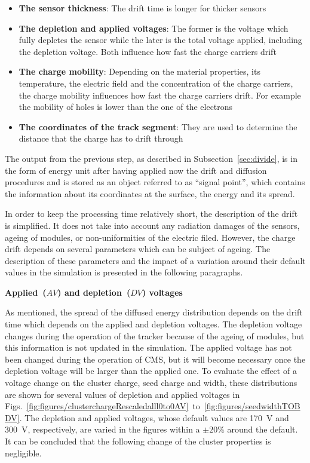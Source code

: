 \begin{itemize}
\item \textbf{The sensor thickness}: The drift time is longer for thicker sensors
\item \textbf{The depletion and applied voltages}:  The former is the voltage which fully depletes the sensor while the later is the total voltage applied, including the depletion voltage. Both influence how fast the charge carriers drift
\item \textbf{The charge mobility}: Depending on the material properties, its temperature, the electric field and the concentration of the charge carriers, the charge mobility influences how fast the charge carriers drift. For example the mobility of holes is lower than the one of the electrons
\item \textbf{The coordinates of the track segment}: They are used to determine the distance that the charge  has to drift through
\end{itemize}


The output from the previous step, as described in Subsection~\ref{sec:divide}, is in the form of energy unit after having applied now the drift and diffusion procedures and is stored as an object referred to as ``signal point'', which contains the information about its coordinates at the surface, the energy and its spread.

In order to keep the processing time relatively short, the description of the drift is simplified. It does not take into account any radiation damages of the sensors, ageing of modules, or non-uniformities of the electric filed. However, the charge drift depends on several parameters which can be subject of ageing. The description of these parameters and the impact of a variation around their default values in the  simulation is presented in the following paragraphs. 

\textbf{Applied~($AV$) and depletion~($DV$) voltages}

As mentioned, the spread of the diffused energy distribution depends on the drift time which depends on the applied and depletion voltages. The depletion voltage changes during the operation of the tracker because of the ageing of modules, but this information is not updated in the simulation. The applied voltage has not been changed during the operation of CMS, but it will become necessary once the depletion voltage will be larger than the applied one. To evaluate the effect of a voltage change on the cluster charge, seed charge and width, these distributions are shown for several values of depletion and applied voltages in Figs.~\ref{fig:figures/clusterchargeRescaledalll0to0AV}~to~\ref{fig:figures/seedwidthTOBDV}. The depletion and applied voltages, whose default values are 170~V and  300~V, respectively, are varied in the figures within a $\pm 20\%$ around the default. It can be concluded that the following change of the cluster properties is negligible.

